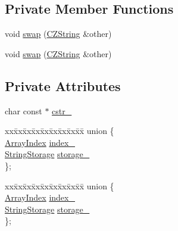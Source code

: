 \subsection*{Private Member Functions}
\begin{DoxyCompactItemize}
\item 
void \hyperlink{class_json_1_1_value_1_1_c_z_string_ad59f3542d2eea749a6a63409d1a02207}{swap} (\hyperlink{class_json_1_1_value_1_1_c_z_string}{C\+Z\+String} \&other)
\item 
void \hyperlink{class_json_1_1_value_1_1_c_z_string_ad59f3542d2eea749a6a63409d1a02207}{swap} (\hyperlink{class_json_1_1_value_1_1_c_z_string}{C\+Z\+String} \&other)
\end{DoxyCompactItemize}
\subsection*{Private Attributes}
\begin{DoxyCompactItemize}
\item 
char const  $\ast$ \hyperlink{class_json_1_1_value_1_1_c_z_string_a9195eb3d83f19d625b02a5d52d9028b7}{cstr\+\_\+}
\item 
\begin{tabbing}
xx\=xx\=xx\=xx\=xx\=xx\=xx\=xx\=xx\=\kill
union \{\\
\>\hyperlink{class_json_1_1_value_a184a91566cccca7b819240f0d5561c7d}{ArrayIndex} \hyperlink{class_json_1_1_value_1_1_c_z_string_aecf29982235c9c165a0971023ebbb270}{index\_}\\
\>\hyperlink{struct_json_1_1_value_1_1_c_z_string_1_1_string_storage}{StringStorage} \hyperlink{class_json_1_1_value_1_1_c_z_string_a17c92f0f089a4314e3b1d5695dc1a851}{storage\_}\\
\}; \\

\end{tabbing}\item 
\begin{tabbing}
xx\=xx\=xx\=xx\=xx\=xx\=xx\=xx\=xx\=\kill
union \{\\
\>\hyperlink{class_json_1_1_value_a184a91566cccca7b819240f0d5561c7d}{ArrayIndex} \hyperlink{class_json_1_1_value_1_1_c_z_string_aecf29982235c9c165a0971023ebbb270}{index\_}\\
\>\hyperlink{struct_json_1_1_value_1_1_c_z_string_1_1_string_storage}{StringStorage} \hyperlink{class_json_1_1_value_1_1_c_z_string_a17c92f0f089a4314e3b1d5695dc1a851}{storage\_}\\
\}; \\

\end{tabbing}\end{DoxyCompactItemize}


